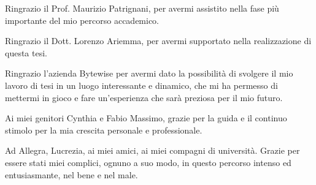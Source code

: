 Ringrazio il Prof. Maurizio Patrignani, per avermi assistito nella fase più importante del mio percorso accademico.

\noindent Ringrazio il Dott. Lorenzo Ariemma, per avermi supportato nella realizzazione di questa tesi.

\noindent Ringrazio l'azienda Bytewise per avermi dato la possibilità di svolgere il mio lavoro di tesi in un luogo interessante e dinamico, che mi ha permesso di mettermi in gioco e fare un'esperienza che sarà preziosa per il mio futuro.

\noindent Ai miei genitori Cynthia e Fabio Massimo, grazie per la guida e il continuo stimolo per la mia crescita personale e professionale.

\noindent Ad Allegra, Lucrezia, ai miei amici, ai miei compagni di università. Grazie per essere stati miei complici, ognuno a suo modo, in questo percorso intenso ed entusiasmante, nel bene e nel male.

